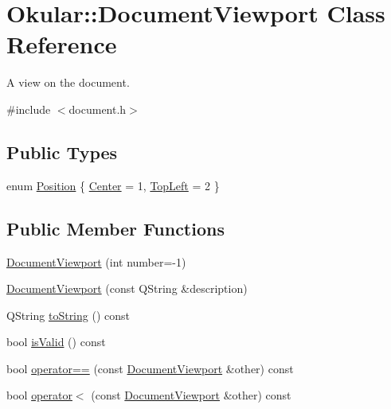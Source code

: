 \hypertarget{classOkular_1_1DocumentViewport}{\section{Okular\+:\+:Document\+Viewport Class Reference}
\label{classOkular_1_1DocumentViewport}
}


A view on the document.  




{\ttfamily \#include $<$document.\+h$>$}

\subsection*{Public Types}
\begin{DoxyCompactItemize}
\item 
enum \hyperlink{classOkular_1_1DocumentViewport_aad7228ed215e5a676cf50dabd4e41552}{Position} \{ \hyperlink{classOkular_1_1DocumentViewport_aad7228ed215e5a676cf50dabd4e41552a254c6d87e8ba55bb53347ff32e501167}{Center} = 1, 
\hyperlink{classOkular_1_1DocumentViewport_aad7228ed215e5a676cf50dabd4e41552a7a96c06e6321a16c2efccd08095bc59d}{Top\+Left} = 2
 \}
\end{DoxyCompactItemize}
\subsection*{Public Member Functions}
\begin{DoxyCompactItemize}
\item 
\hyperlink{classOkular_1_1DocumentViewport_a917400b59b99798882d831e215bd7793}{Document\+Viewport} (int number=-\/1)
\item 
\hyperlink{classOkular_1_1DocumentViewport_a4538363620c63a7c030b7e6fa0d40601}{Document\+Viewport} (const Q\+String \&description)
\item 
Q\+String \hyperlink{classOkular_1_1DocumentViewport_a77e42e0c9502b91085cd25f845ecafa0}{to\+String} () const 
\item 
bool \hyperlink{classOkular_1_1DocumentViewport_a13161b17f2d0b68bf033955f81d41584}{is\+Valid} () const 
\item 
bool \hyperlink{classOkular_1_1DocumentViewport_a3f27a5e264f7eac910711e9b05ac3103}{operator==} (const \hyperlink{classOkular_1_1DocumentViewport}{Document\+Viewport} \&other) const 
\item 
bool \hyperlink{classOkular_1_1DocumentViewport_a27140735768c683c81fc9e6d63ef3313}{operator$<$} (const \hyperlink{classOkular_1_1DocumentViewport}{Document\+Viewport} \&other) const 
\end{DoxyCompactItemize}
